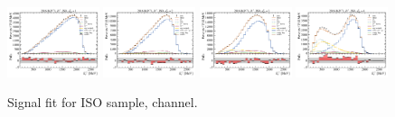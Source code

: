 \begin{figure}[!htb]
    \includegraphics[width=0.24\textwidth]{./figs-fit-fit-results/sig-fit/lines_q2_slices/fit_result-lines_q2_idx1-Dst-iso-el.pdf}
    \includegraphics[width=0.24\textwidth]{./figs-fit-fit-results/sig-fit/lines_q2_slices/fit_result-lines_q2_idx2-Dst-iso-el.pdf}
    \includegraphics[width=0.24\textwidth]{./figs-fit-fit-results/sig-fit/lines_q2_slices/fit_result-lines_q2_idx3-Dst-iso-el.pdf}
    \includegraphics[width=0.24\textwidth]{./figs-fit-fit-results/sig-fit/lines_q2_slices/fit_result-lines_q2_idx4-Dst-iso-el.pdf}

    \caption{Signal fit for ISO sample, \Dstar channel.}
    \label{fig:sig-dst}
\end{figure}

